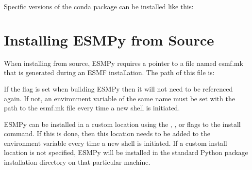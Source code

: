 \documentclass[letterpaper,10pt,english]{sphinxmanual}
\begin{document}
\begin{sphinxVerbatim}[commandchars=\\\{\}]
      
\end{sphinxVerbatim}

Specific versions of the conda package can be installed like this:

\begin{sphinxVerbatim}[commandchars=\\\{\}]
      
\end{sphinxVerbatim}


\section{Installing ESMPy from Source}
\label{\detokenize{install:installing-esmpy-from-source}}
When installing from source, ESMPy requires a pointer to a file named esmf.mk
that is generated during an ESMF installation.  The path of this file is:

\begin{sphinxVerbatim}[commandchars=\\\{\}]
\end{sphinxVerbatim}

If the  flag is set when building ESMPy then it will not need to be
referenced again.  If not, an environment variable of the same name must be set
with the path to the esmf.mk file every time a new shell is initiated.

ESMPy can be installed in a custom location using the
, , or  flags to the install command.  If this
is done, then this location needs to be added to the  environment
variable every time a new shell is initiated.  If a
custom install location is not specified, ESMPy will be installed in the
standard Python package installation directory on that particular machine.
\end{document}
